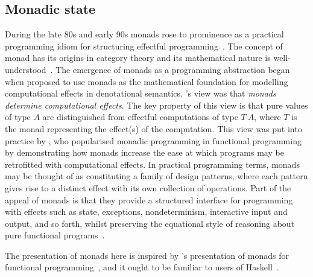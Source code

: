\documentclass[12pt,phd,lfcs,twoside,openright,logo,leftchapter,normalheadings]{infthesis}
\theoremstyle{plain}
\theoremstyle{definition}
\begin{document}
\subsection{Monadic state}
\label{sec:monadic-state}
During the late 80s and early 90s monads rose to prominence as a
practical programming idiom for structuring effectful
programming~\cite{Moggi89,Moggi91,Wadler92,Wadler92b,JonesW93,Wadler95,JonesABBBFHHHHJJLMPRRW99}.
%
The concept of monad has its origins in category theory and its
mathematical nature is well-understood~\cite{MacLane71,Borceux94}. The
emergence of monads as a programming abstraction began when
\citet{Moggi89,Moggi91} proposed to use monads as the mathematical
foundation for modelling computational effects in denotational
semantics. \citeauthor{Moggi91}'s view was that \emph{monads determine
  computational effects}. The key property of this view is that pure
values of type $A$ are distinguished from effectful computations of
type $T~A$, where $T$ is the monad representing the effect(s) of the
computation. This view was put into practice by
\citet{Wadler92,Wadler95}, who popularised monadic programming in
functional programming by demonstrating how monads increase the ease
at which programs may be retrofitted with computational effects.
%
In practical programming terms, monads may be thought of as
constituting a family of design patterns, where each pattern gives
rise to a distinct effect with its own collection of operations.
%
Part of the appeal of monads is that they provide a structured
interface for programming with effects such as state, exceptions,
nondeterminism, interactive input and output, and so forth, whilst
preserving the equational style of reasoning about pure functional
programs~\cite{GibbonsH11,Gibbons12}.
%
%

The presentation of monads here is inspired by \citeauthor{Wadler92}'s
presentation of monads for functional programming~\cite{Wadler92}, and
it ought to be familiar to users of
Haskell~\cite{JonesABBBFHHHHJJLMPRRW99}.
\end{document}
